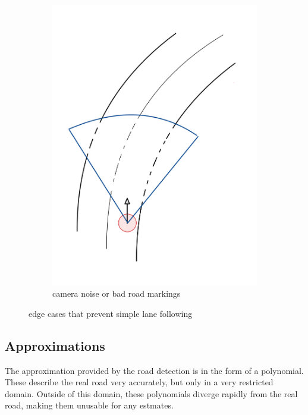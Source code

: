 \begin{figure}
\begin{subfigure}{.24\linewidth}
		\includegraphics[width=\textwidth]{Pictures/road detection noise}
		
		\caption{camera noise or bad road markings}
	\end{subfigure}


	\caption{edge cases that prevent simple lane following}
	\label{nav edge case}
\end{figure}



\subsection{Approximations}
The approximation provided by the road detection is in the form of a polynomial. These describe the real road very accurately, but only in a very restricted domain. Outside of this domain, these polynomials diverge rapidly from the real road, making them unusable for any estmates.

